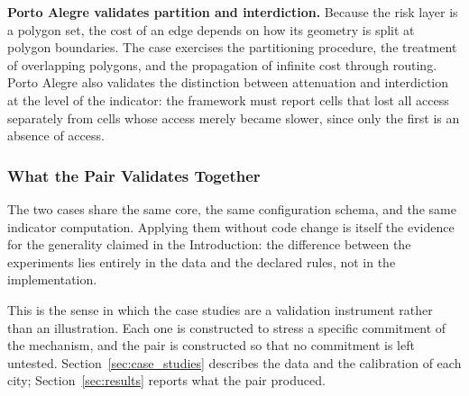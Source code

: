 \textbf{Porto Alegre validates partition and interdiction.} Because the risk layer is a polygon set, the cost of an edge depends on how its geometry is split at polygon boundaries. The case exercises the partitioning procedure, the treatment of overlapping polygons, and the propagation of infinite cost through routing. Porto Alegre also validates the distinction between attenuation and interdiction at the level of the indicator: the framework must report cells that lost all access separately from cells whose access merely became slower, since only the first is an absence of access.

\subsubsection{What the Pair Validates Together}

The two cases share the same core, the same configuration schema, and the same indicator computation. Applying them without code change is itself the evidence for the generality claimed in the Introduction: the difference between the experiments lies entirely in the data and the declared rules, not in the implementation.

This is the sense in which the case studies are a validation instrument rather than an illustration. Each one is constructed to stress a specific commitment of the mechanism, and the pair is constructed so that no commitment is left untested. Section~\ref{sec:case_studies} describes the data and the calibration of each city; Section~\ref{sec:results} reports what the pair produced.
